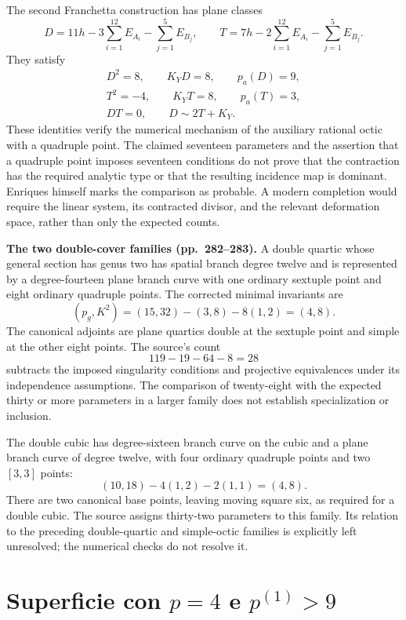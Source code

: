 The second Franchetta construction has plane classes
\[
D=11h-3\sum_{i=1}^{12}E_{A_i}-\sum_{j=1}^{5}E_{B_j},
\qquad
T=7h-2\sum_{i=1}^{12}E_{A_i}-\sum_{j=1}^{5}E_{B_j}.
\]
They satisfy
\[
\begin{gathered}
D^2=8,\qquad K_YD=8,\qquad p_a(D)=9,\\
T^2=-4,\qquad K_YT=8,\qquad p_a(T)=3,\\
DT=0,\qquad D\sim2T+K_Y.
\end{gathered}
\]
These identities verify the numerical mechanism of the auxiliary rational octic with a quadruple point. The claimed seventeen parameters and the assertion that a quadruple point imposes seventeen conditions do not prove that the contraction has the required analytic type or that the resulting incidence map is dominant. Enriques himself marks the comparison as probable. A modern completion would require the linear system, its contracted divisor, and the relevant deformation space, rather than only the expected counts.

\textbf{The two double-cover families (pp.~282--283).}
A double quartic whose general section has genus two has spatial branch degree twelve and is represented by a degree-fourteen plane branch curve with one ordinary sextuple point and eight ordinary quadruple points. The corrected minimal invariants are
\[
(p_g,K^2)=(15,32)-(3,8)-8(1,2)=(4,8).
\]
The canonical adjoints are plane quartics double at the sextuple point and simple at the other eight points. The source's count
\[
119-19-64-8=28
\]
subtracts the imposed singularity conditions and projective equivalences under its independence assumptions. The comparison of twenty-eight with the expected thirty or more parameters in a larger family does not establish specialization or inclusion.

The double cubic has degree-sixteen branch curve on the cubic and a plane branch curve of degree twelve, with four ordinary quadruple points and two \([3,3]\) points:
\[
(10,18)-4(1,2)-2(1,1)=(4,8).
\]
There are two canonical base points, leaving moving square six, as required for a double cubic. The source assigns thirty-two parameters to this family. Its relation to the preceding double-quartic and simple-octic families is explicitly left unresolved; the numerical checks do not resolve it.

\section{Superficie con \texorpdfstring{$p=4$}{p=4} e \texorpdfstring{$p^{(1)}>9$}{p(1)>9}}
\label{cp2-viii-6}

